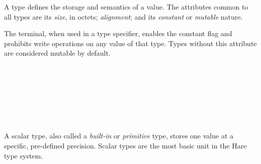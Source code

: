 
\begin{grammar}
 \\
	 \\
	 \\
	 \\
	 \\
	 \\
	 \\
	 \\
	 \\
	  \\
\end{grammar}

\specsubitem
A type defines the storage and semantics of a value. The attributes common to
all types are its \textit{size}, in octets; \textit{alignment}; and its
\textit{constant} or \textit{mutable} nature.

\specsubitem
The  terminal, when used in a type specifier, enables the
constant flag and prohibits write operations on any value of that type. Types
without this attribute are considered mutable by default.


\begin{grammar}
 \\
	 \\
	 \\
	 \\
	 \\
	 \\
\end{grammar}

\specsubsubitem
A scalar type, also called a \textit{built-in} or \textit{primitive} type,
stores one value at a specific, pre-defined precision. Scalar types are the
most basic unit in the Hare type system.





